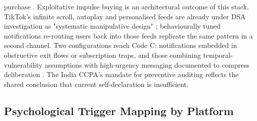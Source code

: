 \documentclass[11pt]{article}
\begin{document}
purchase \parencites[139]{8745065}. Exploitative impulse buying is an architectural outcome of this stack. TikTok's infinite scroll, autoplay and personalised feeds are already under DSA investigation as "systematic manipulative design" \parencites[2]{8958037}; behaviourally tuned notifications re-routing users back into those feeds replicate the same pattern in a second channel. Two configurations reach Code C: notifications embedded in obstructive exit flows or subscription traps, and those combining temporal-vulnerability assumptions with high-urgency messaging documented to compress deliberation \parencites[8]{6295677}[138]{8745065}. The India CCPA's mandate for preventive auditing reflects the shared conclusion that current self-declaration is insufficient.

\subsection{Psychological Trigger Mapping by Platform}
\end{document}
